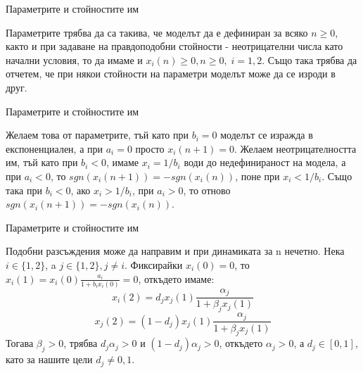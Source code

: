 
\begin{frame}[t]{Параметрите и стойностите им}

  Параметрите трябва да са такива, че моделът да е дефиниран за всяко $n \geq 0$, както и при задаване на правдоподобни стойности - неотрицателни числа като начални условия, то да имаме и $x_{i}(n) \geq 0, n \geq 0, \; i=1,2$. Също така трябва да отчетем, че при някои стойности на параметри моделът може да се изроди в друг.

\end{frame}

\begin{frame}[t]{Параметрите и стойностите им}

  Желаем това от параметрите, тъй като при $b_{i}=0$ моделът се изражда в експоненциален, а при $a_{i}=0$ просто $x_{i}(n+1)=0$. Желаем неотрицателността им, тъй като при $b_{i} < 0$, имаме $x_{i} = 1/b_{i}$ води до недефинираност на модела, а при $a_{i} < 0 $, то $sgn(x_{i}(n+1)) = - sgn(x_{i}(n))$, поне при $x_{i} < 1/b_{i}$. Също така при $b_{i} < 0$, ако $x_{i} > 1/b_{i}$, при $a_{i} > 0 $, то отново $sgn(x_{i}(n+1)) = - sgn(x_{i}(n))$.

\end{frame}

\begin{frame}[t]{Параметрите и стойностите им}

  Подобни разсъждения може да направим и при динамиката за n нечетно. Нека $i \in \{1, 2\}$, a $j \in \{1, 2\}, j \neq i$. Фиксирайки $x_{i}(0)=0$, то $x_{i}(1)=x_{i}(0)\frac{a_{i}}{1+b_{i} x_{i}(0)}=0$, откъдето имаме:
  \[x_{i}(2)=d_{j} x_{j}(1)\frac{\alpha_{j}}{1+\beta_{j} x_{j}(1)}\]
  \[x_{j}(2)=(1-d_{j}) x_{j}(1)\frac{\alpha_{j}}{1+\beta_{j} x_{j}(1)}\] Тогава $\beta_{j} > 0$, трябва $d_{j}\alpha_{j}>0$ и $(1-d_{j})\alpha_{j}>0$, откъдето $\alpha_{j}>0$, а $d_{j} \in [0,1]$, като за нашите цели $d_{j} \neq 0, 1$.

\end{frame}
